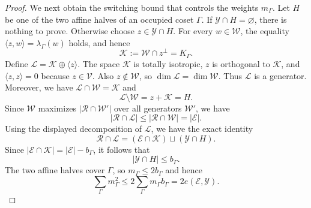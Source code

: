 \documentclass[10pt,a4paper]{amsart}
\begin{document}
\begin{proof}
We next obtain the switching bound that controls the weights
\(m_\Gamma\).  Let \(H\) be one of the two affine halves of an occupied
coset \(\Gamma\).  If \(\mathcal Y\cap H=\varnothing\), there is nothing to
prove.  Otherwise choose \(z\in\mathcal Y\cap H\).  For every
\(w\in\mathcal W\), the equality
\(\langle z,w\rangle=\lambda_\Gamma(w)\) holds, and hence
\[
 \mathcal K:=\mathcal W\cap z^\perp=K_\Gamma.
\]
Define \(\mathcal L=\mathcal K\oplus\langle z\rangle\). The space \(\mathcal K\) is totally isotropic, \(z\) is orthogonal to
\(\mathcal K\), and \(\langle z,z\rangle=0\) because
\(z\in\mathcal V\).  Also \(z\notin\mathcal W\), so
\(\dim\mathcal L=\dim\mathcal W\).  Thus \(\mathcal L\) is a generator.
Moreover, we have \(\mathcal L\cap\mathcal W=\mathcal K\) and
\[
 \mathcal L\setminus\mathcal W=z+\mathcal K=H.
\]
Since \(\mathcal W\) maximizes \(|\mathcal R\cap\mathcal W'|\) over all
generators \(\mathcal W'\), we have
\[
 |\mathcal R\cap\mathcal L|
 \le
 |\mathcal R\cap\mathcal W|
 =|\mathcal E|.
\]
Using the displayed decomposition of \(\mathcal L\), we have the exact
identity
\[
 \mathcal R\cap\mathcal L
 =
 (\mathcal E\cap\mathcal K)
 \sqcup
 (\mathcal Y\cap H).
\]
Since \(|\mathcal E\cap\mathcal K|=|\mathcal E|-b_\Gamma\), it follows
that
\[
 |\mathcal Y\cap H|\le b_\Gamma.
\]
The two affine halves cover \(\Gamma\), so \(m_\Gamma\le 2b_\Gamma\) and hence
\begin{equation}
 \sum_\Gamma m_\Gamma^2
 \le
 2\sum_\Gamma m_\Gamma b_\Gamma
 =2e(\mathcal E,\mathcal Y).
\label{eq:weight-energy}
\end{equation}


\end{proof}
\end{document}
